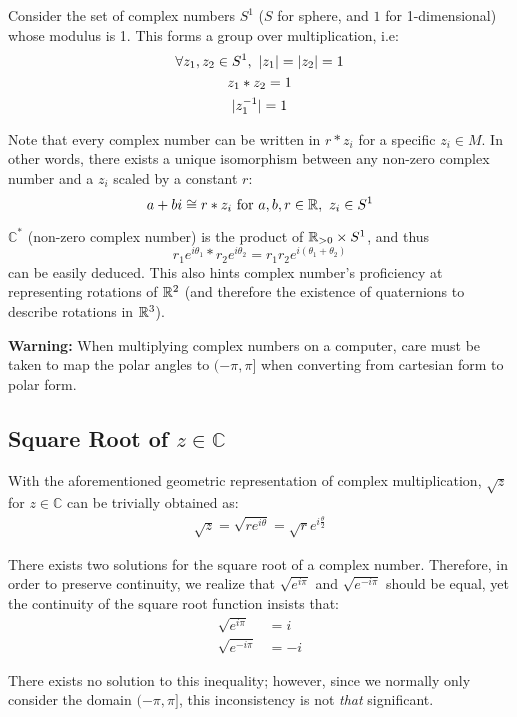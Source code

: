 \documentclass[12pt]{article}
\begin{document}
	Consider the set of complex numbers $S^1$ ($S$ for sphere, and $1$ for 1-dimensional) whose modulus is 1. This forms a group over multiplication, i.e:
	\begin{gather*}
		\forall z_1, z_2 \in S^1,\ \lvert z_1 \rvert = \lvert z_2 \rvert = 1 \\
		z_1 * z_2 = 1 \\
		\lvert z_1^{-1} \rvert = 1
	\end{gather*}
	
	Note that every complex number can be written in $r * z_i$ for a specific $z_i \in M$. In other words, there exists a unique isomorphism between any non-zero complex number and a $z_i$ scaled by a constant $r$: $$a + bi \cong r * z_i \ \text{for}\ a, b, r \in \mathbb{R},\ z_i \in S^1$$
	
	
	$\mathbb{C}^*$ (non-zero complex number) is the product of $\mathbb{R}_{>0} \times S^1$, and thus $$r_1 e^{i\theta_1} * r_2 e^{i\theta_2} = r_1r_2e^{i(\theta_1 + \theta_2)}$$
	can be easily deduced. This also hints complex number's proficiency at representing rotations of $\mathbb{R}^2$ (and therefore the existence of quaternions to describe rotations in $\mathbb{R}^3$).
	
	\textbf{Warning:} When multiplying complex numbers on a computer, care must be taken to map the polar angles to $(-\pi, \pi]$ when converting from cartesian form to polar form.
	
	\subsection{Square Root of $z \in \mathbb{C}$}
	
	With the aforementioned geometric representation of complex multiplication, $\sqrt{z}$ for $z \in \mathbb{C}$ can be trivially obtained as:
	\begin{gather*}
		\sqrt{z} = \sqrt{re^{i\theta}} = \sqrt{r}e^{i\frac{\theta}{2}}
	\end{gather*}
	
	There exists two solutions for the square root of a complex number. Therefore, in order to preserve continuity, we realize that $\sqrt{e^{i\pi}}$ and $\sqrt{e^{-i\pi}}$ should be equal, yet the continuity of the square root function insists that:
	\begin{align*}
		\sqrt{e^{i\pi}} &= i \\
		\sqrt{e^{-i\pi}} &= -i
	\end{align*}
	
	There exists no solution to this inequality; however, since we normally only consider the domain $(-\pi, \pi]$, this inconsistency is not \textit{that} significant.
	
\end{document}
